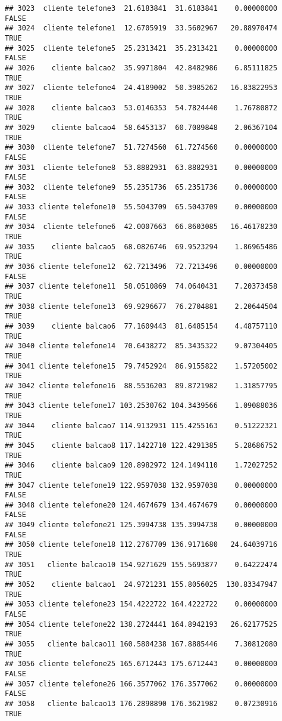 \documentclass[
]{article}
\begin{document}
\begin{verbatim}
## 3023  cliente telefone3  21.6183841  31.6183841    0.00000000    FALSE
## 3024  cliente telefone1  12.6705919  33.5602967   20.88970474     TRUE
## 3025  cliente telefone5  25.2313421  35.2313421    0.00000000    FALSE
## 3026    cliente balcao2  35.9971804  42.8482986    6.85111825     TRUE
## 3027  cliente telefone4  24.4189002  50.3985262   16.83822953     TRUE
## 3028    cliente balcao3  53.0146353  54.7824440    1.76780872     TRUE
## 3029    cliente balcao4  58.6453137  60.7089848    2.06367104     TRUE
## 3030  cliente telefone7  51.7274560  61.7274560    0.00000000    FALSE
## 3031  cliente telefone8  53.8882931  63.8882931    0.00000000    FALSE
## 3032  cliente telefone9  55.2351736  65.2351736    0.00000000    FALSE
## 3033 cliente telefone10  55.5043709  65.5043709    0.00000000    FALSE
## 3034  cliente telefone6  42.0007663  66.8603085   16.46178230     TRUE
## 3035    cliente balcao5  68.0826746  69.9523294    1.86965486     TRUE
## 3036 cliente telefone12  62.7213496  72.7213496    0.00000000    FALSE
## 3037 cliente telefone11  58.0510869  74.0640431    7.20373458     TRUE
## 3038 cliente telefone13  69.9296677  76.2704881    2.20644504     TRUE
## 3039    cliente balcao6  77.1609443  81.6485154    4.48757110     TRUE
## 3040 cliente telefone14  70.6438272  85.3435322    9.07304405     TRUE
## 3041 cliente telefone15  79.7452924  86.9155822    1.57205002     TRUE
## 3042 cliente telefone16  88.5536203  89.8721982    1.31857795     TRUE
## 3043 cliente telefone17 103.2530762 104.3439566    1.09088036     TRUE
## 3044    cliente balcao7 114.9132931 115.4255163    0.51222321     TRUE
## 3045    cliente balcao8 117.1422710 122.4291385    5.28686752     TRUE
## 3046    cliente balcao9 120.8982972 124.1494110    1.72027252     TRUE
## 3047 cliente telefone19 122.9597038 132.9597038    0.00000000    FALSE
## 3048 cliente telefone20 124.4674679 134.4674679    0.00000000    FALSE
## 3049 cliente telefone21 125.3994738 135.3994738    0.00000000    FALSE
## 3050 cliente telefone18 112.2767709 136.9171680   24.64039716     TRUE
## 3051   cliente balcao10 154.9271629 155.5693877    0.64222474     TRUE
## 3052    cliente balcao1  24.9721231 155.8056025  130.83347947     TRUE
## 3053 cliente telefone23 154.4222722 164.4222722    0.00000000    FALSE
## 3054 cliente telefone22 138.2724441 164.8942193   26.62177525     TRUE
## 3055   cliente balcao11 160.5804238 167.8885446    7.30812080     TRUE
## 3056 cliente telefone25 165.6712443 175.6712443    0.00000000    FALSE
## 3057 cliente telefone26 166.3577062 176.3577062    0.00000000    FALSE
## 3058   cliente balcao13 176.2898890 176.3621982    0.07230916     TRUE

\end{verbatim}
\end{document}
